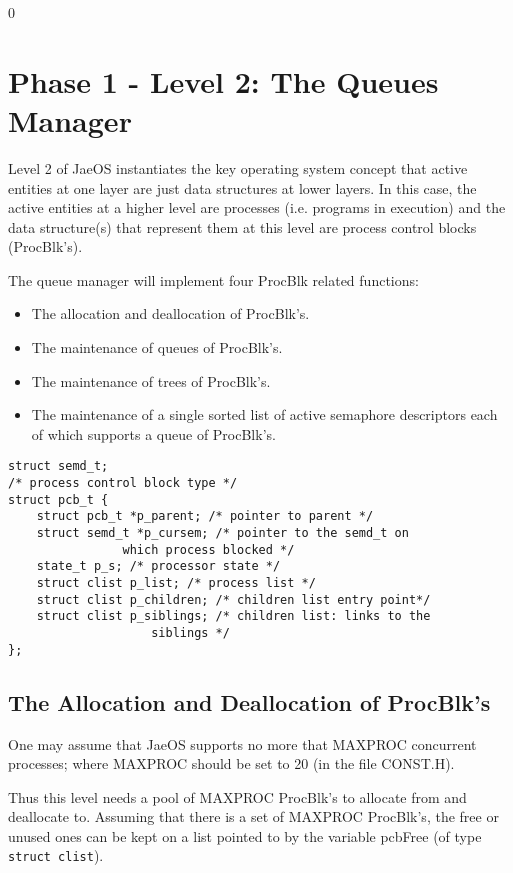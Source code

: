 \setcounter {section} {0}
\section{Phase 1 - Level 2: The Queues Manager}

Level 2 of JaeOS instantiates the key operating system concept that active entities at one layer are just data structures at lower layers. 
In this case, the active entities at a higher level are processes (i.e. programs in execution) and the data structure(s) that represent them at this level are process control blocks (ProcBlk’s).

The queue manager will implement four ProcBlk related functions:
\begin{itemize}
	\item The allocation and deallocation of ProcBlk’s.
	\item The maintenance of queues of ProcBlk’s.
	\item The maintenance of trees of ProcBlk’s.
	\item The maintenance of a single sorted list of active semaphore descriptors each of which supports a queue of ProcBlk’s.
\end{itemize}

\noindent
\begin{lstlisting}
struct semd_t;
/* process control block type */
struct pcb_t {
    struct pcb_t *p_parent; /* pointer to parent */
    struct semd_t *p_cursem; /* pointer to the semd_t on
				which process blocked */
    state_t p_s; /* processor state */
    struct clist p_list; /* process list */
    struct clist p_children; /* children list entry point*/
    struct clist p_siblings; /* children list: links to the 
    				siblings */
};
\end{lstlisting}

\subsection{The Allocation and Deallocation of ProcBlk’s}

One may assume that JaeOS supports no more that MAXPROC concurrent processes; where MAXPROC should be set to 20 (in the file CONST.H).

Thus this level needs a pool of MAXPROC ProcBlk’s to allocate from and deallocate to. 
Assuming that there is a set of MAXPROC ProcBlk’s, the free or unused ones can be kept on a list pointed to by the variable pcbFree (of type \verb+struct clist+).


